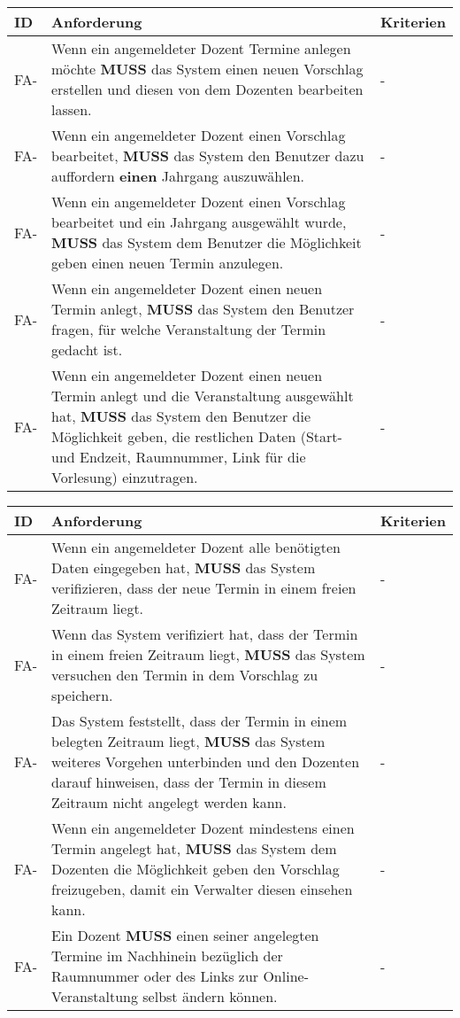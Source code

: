 \newpage

\begin{tabular} {|p{}|p{11cm}|p{}|}
	\hline
	ID & Anforderung & Kriterien \\
	\hline
	FA-
	& Wenn ein angemeldeter Dozent Termine anlegen möchte \textbf{MUSS} das System einen neuen Vorschlag erstellen und diesen von dem Dozenten bearbeiten lassen.
	& - \\
	\hline
	FA-
	& Wenn ein angemeldeter Dozent einen Vorschlag bearbeitet, \textbf{MUSS} das System den Benutzer dazu auffordern \textbf{einen} Jahrgang auszuwählen. 
	& - \\
	\hline
	FA-
	& Wenn ein angemeldeter Dozent einen Vorschlag bearbeitet und ein Jahrgang ausgewählt wurde, \textbf{MUSS} das System dem Benutzer die Möglichkeit geben einen neuen Termin anzulegen.  
	& - \\
	\hline
	FA-
	& Wenn ein angemeldeter Dozent einen neuen Termin anlegt, \textbf{MUSS} das System den Benutzer fragen, für welche Veranstaltung der Termin gedacht ist.
	& - \\
	\hline
	FA-
	& Wenn ein angemeldeter Dozent einen neuen Termin anlegt und die Veranstaltung ausgewählt hat, \textbf{MUSS} das System den Benutzer die Möglichkeit geben, die restlichen Daten (Start- und Endzeit, Raumnummer, Link für die Vorlesung) einzutragen. 
	& - \\
	\hline
\end{tabular}

\begin{tabular} {|p{}|p{11cm}|p{}|}
	\hline
	ID & Anforderung & Kriterien \\
	\hline
	FA-
	& Wenn ein angemeldeter Dozent alle benötigten Daten eingegeben hat, \textbf{MUSS} das System verifizieren, dass der neue Termin in einem freien Zeitraum liegt.
	& - \\
	\hline
	FA-
	& Wenn das System verifiziert hat, dass der Termin in einem freien Zeitraum liegt, \textbf{MUSS} das System versuchen den Termin in dem Vorschlag zu speichern.
	& - \\
	\hline
	FA-
	& Das System feststellt, dass der Termin in einem belegten Zeitraum liegt, \textbf{MUSS} das System weiteres Vorgehen unterbinden und den Dozenten darauf hinweisen, dass der Termin in diesem Zeitraum nicht angelegt werden kann.
	& - \\
	\hline
	FA-
	& Wenn ein angemeldeter Dozent mindestens einen Termin angelegt hat, \textbf{MUSS} das System dem Dozenten die Möglichkeit geben den Vorschlag freizugeben, damit ein Verwalter diesen einsehen kann.
	& - \\
	\hline
	FA-
	& Ein Dozent \textbf{MUSS} einen seiner angelegten Termine im Nachhinein bezüglich der Raumnummer oder des Links zur Online-Veranstaltung selbst ändern können.
	& - \\
	\hline
\end{tabular}

